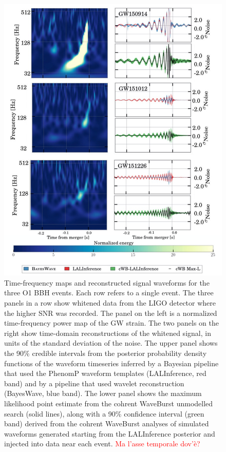 \documentclass[binding=0.6cm, LaM]{sapthesis}
\newcommand{\fpg}[1]{\textcolor{red}{#1} }
\begin{document}
        \begin{figure}[!t]
          \label{o1}
          \includegraphics[scale=0.4]{o1}
          \centering
          \caption{Time-frequency maps and reconstructed signal waveforms for the three O1 BBH events. Each row refers to a single event.  The three panels in a row show whitened data from the LIGO detector where the higher SNR was recorded. The panel on the left is a normalized time-frequency power map of the GW strain.  The two panels on the right show time-domain reconstructions of the whitened signal, in units of the standard deviation of the noise. The upper panel shows the 90\% credible intervals from the posterior probability density functions of the waveform timeseries inferred by a Bayesian pipeline that used the PhenomP waveform templates ({\ttfamily LALInference}, red band) and by a pipeline that used wavelet reconstruction ({\ttfamily BayesWave}, blue band).  The lower panel shows the maximum likelihood point estimate from the {\ttfamily cohrent WaveBurst} unmodelled search (solid lines), along with a 90\% confidence interval (green band) derived from the {\ttfamily cohrent WaveBurst} analyses of simulated waveforms generated starting from the {\ttfamily LALInference} posterior and injected into data near each event. \cite{193} \fpg{Ma l'asse temporale dov'\`e?}}
          \label{fig:o1}
        \end{figure}
\end{document}
